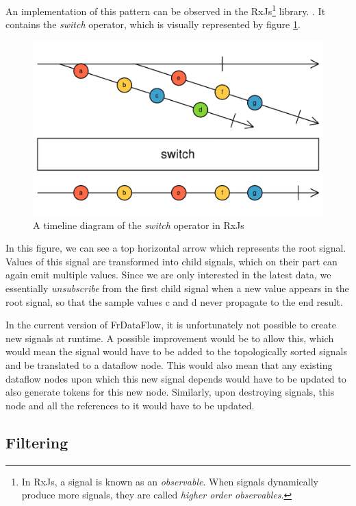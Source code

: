 An implementation of this pattern can be observed in the RxJs\footnote{In RxJs, a signal is known as an \textit{observable}. When signals dynamically produce more signals, they are called \textit{higher order observables}.} library. \citep{noauthor_observable_2017}. It contains the \textit{switch} operator, which is visually represented by figure \ref{fig:futurework-dynamicsignals-switch}.

\begin{figure}[h!]
	\includegraphics[width=\textwidth]{images/FutureWork-DynamicSignals-Switch.png}
	\caption{A timeline diagram of the \textit{switch} operator in RxJs}
	\label{fig:futurework-dynamicsignals-switch}
\end{figure}

In this figure, we can see a top horizontal arrow which represents the root signal. Values of this signal are transformed into child signals, which on their part can again emit multiple values. 
Since we are only interested in the latest data, we essentially \textit{unsubscribe} from the first child signal when a new value appears in the root signal, so that the sample values c and d never propagate to the end result. 

In the current version of FrDataFlow, it is unfortunately not possible to create new signals at runtime. A possible improvement would be to allow this, which would mean the signal would have to be added to the topologically sorted signals and be translated to a dataflow node. This would also mean that any existing dataflow nodes upon which this new signal depends would have to be updated to also generate tokens for this new node. Similarly, upon destroying signals, this node and all the references to it would have to be updated.

\subsection{Filtering}

